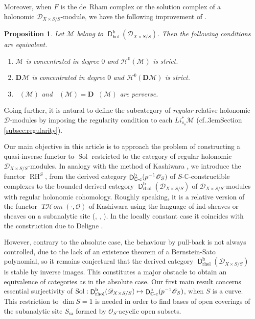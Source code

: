 \documentclass[english]{smfart}
\numberwithin{subsection}{section}
\def\shd{\mathcal{D}}\let\cD\shd
\def\shh{\mathcal{H}}
\def\shh{\mathcal{H}}
\def\shm{\mathcal{M}}
\def\sho{\mathcal{O}}\let\cO\sho
\newcommand{\C}{\mathbb{C}}\let\CC\C
\newcommand{\bD}{\boldsymbol{D}}
\newcommand{\shhom}{\mathcal{H}\!\mathit{om}}\let\ho\shhom
\DeclareMathOperator{\tho}{\mathit{T}\shhom}
\DeclareMathOperator{\RH}{RH}
\newcommand{\rb}{\mathrm{b}}
\newcommand{\hol}{\mathrm{hol}}
\newcommand{\rhol}{\mathrm{rhol}}
\newcommand{\sa}{\mathrm{sa}}
\newcommand{\cc}{{\C\textup{-c}}}
\newcommand{\XS}{X\times S}
\newcommand{\DXS}{\shd_{\XS/S}}
\DeclareMathOperator{\rD}{\mathsf{D}}
\DeclareMathOperator{\pDR}{{}^\mathrm{p}DR}
\DeclareMathOperator{\Sol}{Sol}
\DeclareMathOperator{\pSol}{{}^\mathrm{p}Sol}
\def\cf{cf.\kern.3em}
\newcommand{\pOS}{p^{-1}\sho_S}
\numberwithin{equation}{section}
\theoremstyle{plain}
\newtheorem{propositionintro}[theoremintro]{Proposition}
\theoremstyle{definition}
\def\mto{\mathchoice{\longmapsto}{\mapsto}{\mapsto}{\mapsto}}
\begin{document}
Moreover, when $F$ is the de~Rham complex or the solution complex of a holonomic $\DXS$-module, we have the following improvement of \cite[Th.\,1.2]{MF-S12}.

\begin{propositionintro}\label{P:3.3}
Let $\shm$ belong to $\rD^\rb_{\hol}(\DXS)$. Then the following conditions are equivalent.
\begin{enumerate}
\item
$\shm$ is concentrated in degree $0$ and $\shh^0(\shm)$ is strict.

\item
$\bD \shm$ is concentrated in degree $0$ and $\shh^0(\bD \shm)$ is strict.
\item
$\pSol(\shm)$ and $\pDR(\shm)=\bD\pSol(\shm)$ are perverse.
\end{enumerate}
\end{propositionintro}

Going further, it is natural to define the subcategory of \emph{regular} relative holonomic $\shd$-modules by imposing the regularity condition to each $Li_{s_o}^*\shm$ (\cf Section \ref{subsec:regularity}).

Our main objective in this article is to approach the problem of constructing a quasi-inverse functor to $\Sol$ restricted to the category of regular holonomic $\cD_{\XS/S}$-modules. In analogy with the method of Kashiwara \cite{Kashiwara84}, we introduce the functor $\RH^S$, from the derived category $\rD^\rb_\cc(\pOS)$ of $S$-$\C$-constructible complexes to the bounded derived category $\rD^\rb_\rhol(\cD_{\XS/S})$ of $\cD_{\XS/S}$-modules with regular holonomic cohomology. Roughly speaking, it is a relative version of the functor $\tho(\cdot,\sho)$ of Kashiwara \cite{Kashiwara84} using the language of ind-sheaves or sheaves on a subanalytic site (\cite{K-S01}, \cite{K-Sch06}, \cite{Prelli08}). In the locally constant case it coincides with the construction due to Deligne \cite{Deligne70}.

However, contrary to the absolute case, the behaviour by pull-back is not always controlled, due to the lack of an existence theorem of a Bernstein-Sato polynomial, so it remains conjectural that the derived category $\rD^\rb_\rhol(\cD_{\XS/S})$ is stable by inverse images. This constitutes a major obstacle to obtain an equivalence of categories as in the absolute case. Our first main result concerns essential surjectivity of $\Sol:\rD^\rb_\rhol(\cD_{\XS/S})\mto\rD^\rb_\cc(\pOS)$, when $S$ is a curve. This restriction to $\dim S=1$ is needed in order to find bases of open coverings of the subanalytic site $S_{\sa}$ formed by $\sho_S$-acyclic open subsets.
\end{document}
